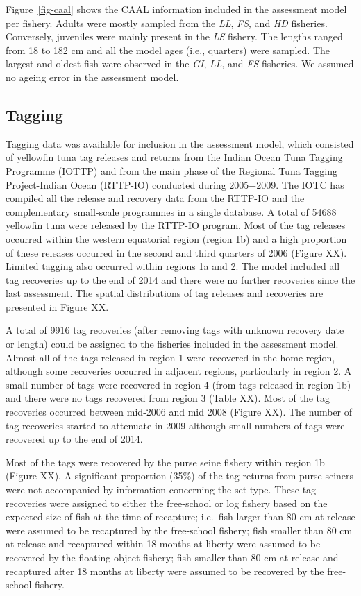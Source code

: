 \documentclass[
]{scrartcl}
\begin{document}
Figure~\ref{fig-caal} shows the CAAL information included in the
assessment model per fishery. Adults were mostly sampled from the
\emph{LL}, \emph{FS}, and \emph{HD} fisheries. Conversely, juveniles
were mainly present in the \emph{LS} fishery. The lengths ranged from 18
to 182 cm and all the model ages (i.e., quarters) were sampled. The
largest and oldest fish were observed in the \emph{GI}, \emph{LL}, and
\emph{FS} fisheries. We assumed no ageing error in the assessment model.

\subsection{Tagging}\label{tagging}

Tagging data was available for inclusion in the assessment model, which
consisted of yellowfin tuna tag releases and returns from the Indian
Ocean Tuna Tagging Programme (IOTTP) and from the main phase of the
Regional Tuna Tagging Project-Indian Ocean (RTTP-IO) conducted during
2005−2009. The IOTC has compiled all the release and recovery data from
the RTTP-IO and the complementary small-scale programmes in a single
database. A total of 54688 yellowfin tuna were released by the RTTP-IO
program. Most of the tag releases occurred within the western equatorial
region (region 1b) and a high proportion of these releases occurred in
the second and third quarters of 2006 (Figure XX). Limited tagging also
occurred within regions 1a and 2. The model included all tag recoveries
up to the end of 2014 and there were no further recoveries since the
last assessment. The spatial distributions of tag releases and
recoveries are presented in Figure XX.

A total of 9916 tag recoveries (after removing tags with unknown
recovery date or length) could be assigned to the fisheries included in
the assessment model. Almost all of the tags released in region 1 were
recovered in the home region, although some recoveries occurred in
adjacent regions, particularly in region 2. A small number of tags were
recovered in region 4 (from tags released in region 1b) and there were
no tags recovered from region 3 (Table XX). Most of the tag recoveries
occurred between mid-2006 and mid 2008 (Figure XX). The number of tag
recoveries started to attenuate in 2009 although small numbers of tags
were recovered up to the end of 2014.

Most of the tags were recovered by the purse seine fishery within region
1b (Figure XX). A significant proportion (35\%) of the tag returns from
purse seiners were not accompanied by information concerning the set
type. These tag recoveries were assigned to either the free-school or
log fishery based on the expected size of fish at the time of recapture;
i.e.~fish larger than 80 cm at release were assumed to be recaptured by
the free-school fishery; fish smaller than 80 cm at release and
recaptured within 18 months at liberty were assumed to be recovered by
the floating object fishery; fish smaller than 80 cm at release and
recaptured after 18 months at liberty were assumed to be recovered by
the free-school fishery.
\end{document}

